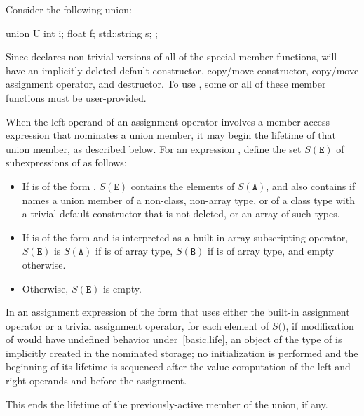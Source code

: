 \pnum
\begin{example}
Consider the following union:

\begin{codeblock}
union U {
  int i;
  float f;
  std::string s;
};
\end{codeblock}

Since  declares non-trivial versions of all of the special
member functions,  will have an implicitly deleted default constructor,
copy/move constructor,
copy/move assignment operator, and destructor.
To use , some or all of these member functions
must be user-provided.
\end{example}

\pnum
When the left operand of an assignment operator
involves a member access expression
that nominates a union member,
it may begin the lifetime of that union member,
as described below.
For an expression ,
define the set $S(\mathtt{E})$
of subexpressions of 
as follows:
\begin{itemize}
\item
If  is of the form ,
$S(\mathtt{E})$ contains the elements of $S(\mathtt{A})$,
and also contains 
if  names a union member of a non-class, non-array type,
or of a class type with a trivial default constructor that is not deleted,
or an array of such types.
\item
If  is of the form 
and is interpreted as a built-in array subscripting operator,
$S(\mathtt{E})$ is $S(\mathtt{A})$ if  is of array type,
$S(\mathtt{B})$ if  is of array type,
and empty otherwise.
\item
Otherwise, $S(\mathtt{E})$ is empty.
\end{itemize}
In an assignment expression of the form 
that uses either the built-in assignment operator
or a trivial assignment operator,
for each element  of $S($$)$,
if modification of  would have undefined behavior under~\ref{basic.life},
an object of the type of  is implicitly created
in the nominated storage;
no initialization is performed and
the beginning of its lifetime is sequenced after
the value computation of the left and right operands
and before the assignment.
\begin{note}
This ends the lifetime of the previously-active
member of the union, if any.
\end{note}

